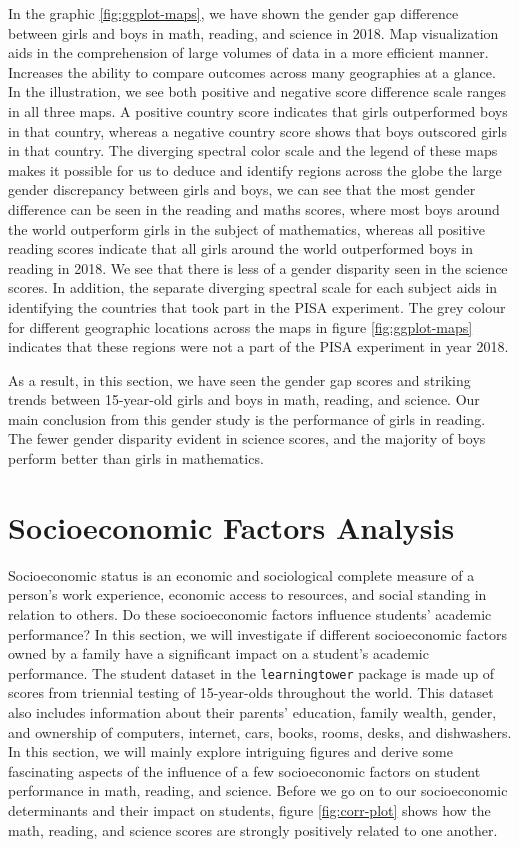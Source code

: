 In the graphic \ref{fig:ggplot-maps}, we have shown the gender gap
difference between girls and boys in math, reading, and science in 2018.
Map visualization aids in the comprehension of large volumes of data in
a more efficient manner. Increases the ability to compare outcomes
across many geographies at a glance. In the illustration, we see both
positive and negative score difference scale ranges in all three maps. A
positive country score indicates that girls outperformed boys in that
country, whereas a negative country score shows that boys outscored
girls in that country. The diverging spectral color scale and the legend
of these maps makes it possible for us to deduce and identify regions
across the globe the large gender discrepancy between girls and boys, we
can see that the most gender difference can be seen in the reading and
maths scores, where most boys around the world outperform girls in the
subject of mathematics, whereas all positive reading scores indicate
that all girls around the world outperformed boys in reading in 2018. We
see that there is less of a gender disparity seen in the science scores.
In addition, the separate diverging spectral scale for each subject aids
in identifying the countries that took part in the PISA experiment. The
grey colour for different geographic locations across the maps in figure
\ref{fig:ggplot-maps} indicates that these regions were not a part of
the PISA experiment in year 2018.

As a result, in this section, we have seen the gender gap scores and
striking trends between 15-year-old girls and boys in math, reading, and
science. Our main conclusion from this gender study is the performance
of girls in reading. The fewer gender disparity evident in science
scores, and the majority of boys perform better than girls in
mathematics.

\hypertarget{socioeconomic-factors-analysis}{%
\section{Socioeconomic Factors
Analysis}\label{socioeconomic-factors-analysis}}

Socioeconomic status is an economic and sociological complete measure of
a person's work experience, economic access to resources, and social
standing in relation to others. Do these socioeconomic factors influence
students' academic performance? In this section, we will investigate if
different socioeconomic factors owned by a family have a significant
impact on a student's academic performance. The student dataset in the
\texttt{learningtower} package is made up of scores from triennial
testing of 15-year-olds throughout the world. This dataset also includes
information about their parents' education, family wealth, gender, and
ownership of computers, internet, cars, books, rooms, desks, and
dishwashers. In this section, we will mainly explore intriguing figures
and derive some fascinating aspects of the influence of a few
socioeconomic factors on student performance in math, reading, and
science. Before we go on to our socioeconomic determinants and their
impact on students, figure \ref{fig:corr-plot} shows how the math,
reading, and science scores are strongly positively related to one
another.

